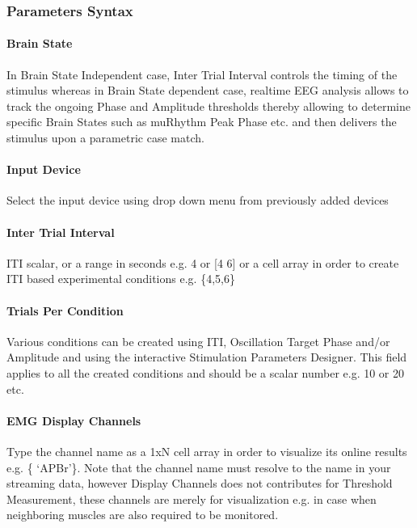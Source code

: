 \documentclass[letterpaper,10pt,english]{sphinxmanual}
\begin{document}
\subsubsection{Parameters Syntax}
\label{\detokenize{9_MEPMeasurement:parameters-syntax}}

\paragraph{Brain State}
\label{\detokenize{9_MEPMeasurement:brain-state}}
\sphinxAtStartPar
In Brain State Independent case, Inter Trial Interval controls the timing of the stimulus whereas in Brain State dependent case, real\sphinxhyphen{}time EEG analysis allows to track the ongoing Phase and Amplitude thresholds thereby allowing to determine specific Brain States such as mu\sphinxhyphen{}Rhythm Peak Phase etc. and then delivers the stimulus upon a parametric case match.


\paragraph{Input Device}
\label{\detokenize{9_MEPMeasurement:input-device}}
\sphinxAtStartPar
Select the input device using drop down menu from previously added devices


\paragraph{Inter Trial Interval}
\label{\detokenize{9_MEPMeasurement:inter-trial-interval}}
\sphinxAtStartPar
ITI scalar, or a range in seconds e.g. 4 or {[}4 6{]} or a cell array in order to create ITI based experimental conditions e.g. \{4,5,6\}


\paragraph{Trials Per Condition}
\label{\detokenize{9_MEPMeasurement:trials-per-condition}}
\sphinxAtStartPar
Various conditions can be created using ITI, Oscillation Target Phase and/or Amplitude and using the interactive Stimulation Parameters Designer. This field applies to all the created conditions and should be a scalar number e.g. 10 or 20 etc.


\paragraph{EMG Display Channels}
\label{\detokenize{9_MEPMeasurement:emg-display-channels}}
\sphinxAtStartPar
Type the channel name as a 1xN cell array in order to visualize its online results e.g. \{ ‘APBr’\}. Note that the channel name must resolve to the name in your streaming data, however Display Channels does not contributes for Threshold Measurement, these channels are merely for visualization e.g. in case when neighboring muscles are also required to be monitored.
\end{document}

